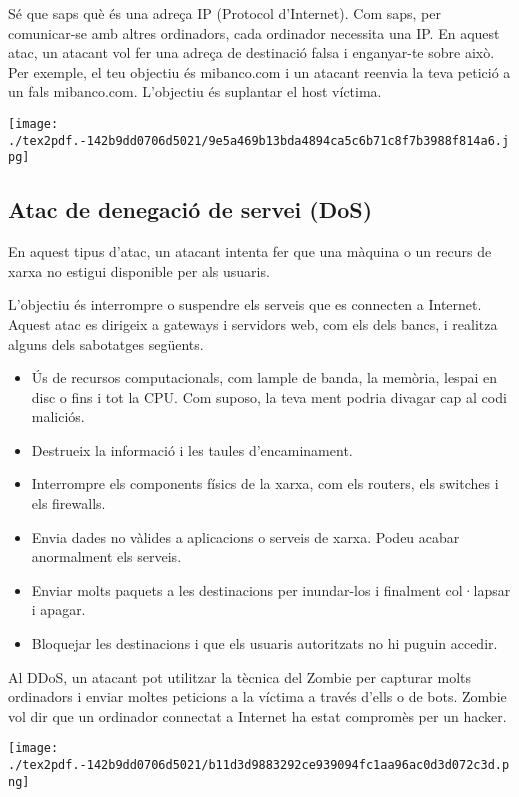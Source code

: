 \documentclass[]{article}
\begin{document}
Sé que saps què és una adreça IP (Protocol d'Internet). Com saps, per
comunicar-se amb altres ordinadors, cada ordinador necessita una IP. En
aquest atac, un atacant vol fer una adreça de destinació falsa i
enganyar-te sobre això. Per exemple, el teu objectiu és mibanco.com i un
atacant reenvia la teva petició a un fals mibanco.com. L'objectiu és
suplantar el host víctima.

\texttt{[image: ./tex2pdf.-142b9dd0706d5021/9e5a469b13bda4894ca5c6b71c8f7b3988f814a6.jpg]}

\hypertarget{atac-de-denegaciuxf3-de-servei-dos}{%
\subsection{Atac de denegació de servei
(DoS)}\label{atac-de-denegaciuxf3-de-servei-dos}}

En aquest tipus d'atac, un atacant intenta fer que una màquina o un
recurs de xarxa no estigui disponible per als usuaris.

L'objectiu és interrompre o suspendre els serveis que es connecten a
Internet. Aquest atac es dirigeix ​​a gateways i servidors web, com els
dels bancs, i realitza alguns dels sabotatges següents.

\begin{itemize}
\item
  Ús de recursos computacionals, com lample de banda, la memòria, lespai
  en disc o fins i tot la CPU. Com suposo, la teva ment podria divagar
  cap al codi maliciós.
\item
  Destrueix la informació i les taules d'encaminament.
\item
  Interrompre els components físics de la xarxa, com els routers, els
  switches i els firewalls.
\item
  Envia dades no vàlides a aplicacions o serveis de xarxa. Podeu acabar
  anormalment els serveis.
\item
  Enviar molts paquets a les destinacions per inundar-los i finalment
  col·lapsar i apagar.
\item
  Bloquejar les destinacions i que els usuaris autoritzats no hi puguin
  accedir.
\end{itemize}

Al DDoS, un atacant pot utilitzar la tècnica del Zombie per capturar
molts ordinadors i enviar moltes peticions a la víctima a través d'ells
o de bots. Zombie vol dir que un ordinador connectat a Internet ha estat
compromès per un hacker.

\texttt{[image: ./tex2pdf.-142b9dd0706d5021/b11d3d9883292ce939094fc1aa96ac0d3d072c3d.png]}
\end{document}
